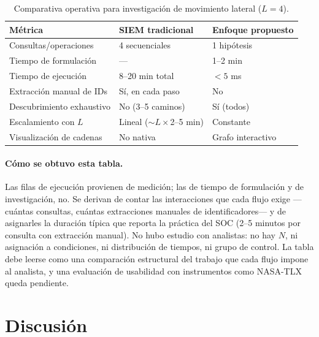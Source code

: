 \documentclass[11pt,a4paper]{article}
\begin{document}
\begin{table}[htbp]
\centering
\caption{Comparativa operativa para investigación de movimiento lateral
($L = 4$).}
\begin{tabular}{lll}
\toprule
\textbf{Métrica} & \textbf{SIEM tradicional} & \textbf{Enfoque propuesto}\\
\midrule
Consultas/operaciones     & 4 secuenciales             & 1 hipótesis\\
Tiempo de formulación     & ---                        & 1--2 min\\
Tiempo de ejecución       & 8--20 min total            & $<5$ ms\\
Extracción manual de IDs  & Sí, en cada paso           & No\\
Descubrimiento exhaustivo & No (3--5 caminos)          & Sí (todos)\\
Escalamiento con $L$      & Lineal (${\sim}L\times$2--5 min) & Constante\\
Visualización de cadenas   & No nativa                  & Grafo interactivo\\
\bottomrule
\end{tabular}
\end{table}

\paragraph{Cómo se obtuvo esta tabla.} Las filas de ejecución provienen de
medición; las de tiempo de formulación y de investigación, no. Se derivan de
contar las interacciones que cada flujo exige ---cuántas consultas, cuántas
extracciones manuales de identificadores--- y de asignarles la duración típica
que reporta la práctica del SOC (2--5 minutos por consulta con extracción
manual). No hubo estudio con analistas: no hay $N$, ni asignación a
condiciones, ni distribución de tiempos, ni grupo de control. La tabla debe
leerse como una comparación estructural del trabajo que cada flujo impone al
analista, y una evaluación de usabilidad con instrumentos como NASA-TLX queda
pendiente.

\section{Discusión}
\end{document}
